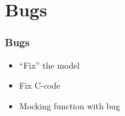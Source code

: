 \documentclass{beamer}
\begin{document}
\section{Bugs}
\begin{frame}
  \frametitle{Bugs}
  \begin{itemize}
    \item ``Fix'' the model
    \item Fix C-code
    \item Mocking function with bug
  \end{itemize}
\end{frame}

\end{document}
